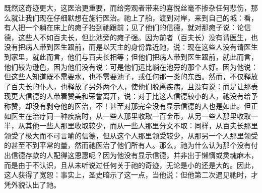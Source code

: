 既然这奇迹更大，这医治更重要，而给旁观者带来的喜悦丝毫不掺杂任何悲伤，那么就让我们现在仔细默想在施行医治。祂上了船，渡到对岸，来到自己的城：看，有人把一个躺在床上的瘫子抬到祂跟前；见了他们的信德，就对那瘫子说：论信德，这些人不如百夫长，但比池旁的瘫子强。因为前者（百夫长）没有请医生，也没有把病人带到医生跟前，而是以天主的身份靠近祂，说：现在这些人没有请医生到家里，就此而言，他们与百夫长相等；但他们把病人带到医生跟前，就此而言，他们较为逊色，因为他们没有说：可是他们远比躺在池旁的那个人好。因为他说：但这些人知道既不需要水，也不需要池子，或任何那一类的东西。然而，不仅释放了百夫长的仆人，也释放了另外两个人，使他们脱离疾病，且没有说：而是让那表现更大信德的人带着赞美和荣誉离开，说：对于比这人信德较小的人，祂没有给予称赞，却没有剥夺他的医治，不！甚至对那完全没有显示信德的人也是如此。但正如医生在治疗同一种疾病时，从一些人那里收取一百金币，从另一些人那里收取一半，从其他一些人那里收取较少，而从一些人那里分文不取：同样，从百夫长那里领受了极大而不可言喻的信德，但从这个人那里领受较少，从那另一个人那里领受的甚至不到平常的量，然而祂医治了他们所有人。那么，祂为什么认为那个没有付出信德存款的人配得这恩惠呢？因为他没有显示信德，并非出于懒惰或灵魂麻木，而是由于不认识，且从未听说过任何关于祂的奇迹，无论是小的还是大的。因此，这人获得了宽恕：事实上，圣史暗示了这一点，当他说：但他第二次遇见祂时，才凭外貌认出了祂。\par

